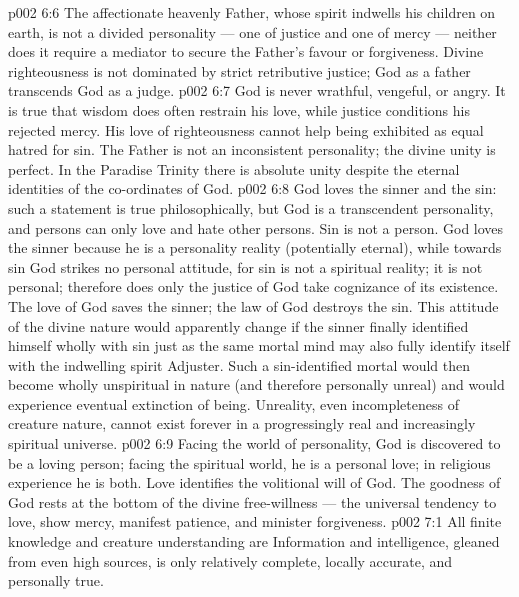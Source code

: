 \vs p002 6:6 The affectionate heavenly Father, whose spirit indwells his children on earth, is not a divided personality --- one of justice and one of mercy --- neither does it require a mediator to secure the Father’s favour or forgiveness. Divine righteousness is not dominated by strict retributive justice; God as a father transcends God as a judge.
\vs p002 6:7 \pc God is never wrathful, vengeful, or angry. It is true that wisdom does often restrain his love, while justice conditions his rejected mercy. His love of righteousness cannot help being exhibited as equal hatred for sin. The Father is not an inconsistent personality; the divine unity is perfect. In the Paradise Trinity there is absolute unity despite the eternal identities of the co\hyp{}ordinates of God.
\vs p002 6:8 \pc God loves the sinner and  the sin: such a statement is true philosophically, but God is a transcendent personality, and persons can only love and hate other persons. Sin is not a person. God loves the sinner because he is a personality reality (potentially eternal), while towards sin God strikes no personal attitude, for sin is not a spiritual reality; it is not personal; therefore does only the justice of God take cognizance of its existence. The love of God saves the sinner; the law of God destroys the sin. This attitude of the divine nature would apparently change if the sinner finally identified himself wholly with sin just as the same mortal mind may also fully identify itself with the indwelling spirit Adjuster. Such a sin\hyp{}identified mortal would then become wholly unspiritual in nature (and therefore personally unreal) and would experience eventual extinction of being. Unreality, even incompleteness of creature nature, cannot exist forever in a progressingly real and increasingly spiritual universe.
\vs p002 6:9 \pc Facing the world of personality, God is discovered to be a loving person; facing the spiritual world, he is a personal love; in religious experience he is both. Love identifies the volitional will of God. The goodness of God rests at the bottom of the divine free\hyp{}willness --- the universal tendency to love, show mercy, manifest patience, and minister forgiveness.
\vs p002 7:1 All finite knowledge and creature understanding are  Information and intelligence, gleaned from even high sources, is only relatively complete, locally accurate, and personally true.
